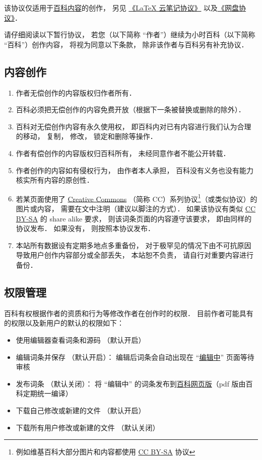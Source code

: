 
该协议仅适用于\href{http://wuli.wiki/online/}{百科内容}的创作， 另见 \href{http://wuli.wiki/online/NtLcns.html}{《LaTeX 云笔记协议》} 以及\href{http://www.example.com}{《网盘协议》}．

请仔细阅读以下暂行协议， 若您（以下简称 “作者”）继续为小时百科（以下简称 “百科”）创作内容， 将视为同意以下条款， 除非该作者与百科另有补充协议．

\subsection{内容创作}
\begin{enumerate}
\item 作者无偿创作的内容版权归作者所有．
\item 百科必须把无偿创作的内容免费开放（根据下一条被替换或删除的除外）．
\item 百科对无偿创作内容有永久使用权， 即百科内对已有内容进行我们认为合理的移动， 复制， 修改， 锁定和删除等操作．
\item 作者有偿创作的内容版权归百科所有， 未经同意作者不能公开转载．
\item 作者创作的内容如有侵权行为， 由作者本人承担， 百科没有义务也没有能力核实所有内容的原创性．
\item 若某页面使用了 \href{https://creativecommons.org/licenses/}{Creative Commons} （简称 CC）系列协议\footnote{例如维基百科大部分图片和内容都使用 \href{https://creativecommons.org/licenses/by-sa/3.0/}{CC BY-SA} 协议}（或类似协议）的图片或内容， 需要在文中注明（建议以脚注的方式）． 如果该协议有类似 \href{https://creativecommons.org/licenses/by-sa/3.0/}{CC BY-SA} 的 share alike 要求， 则该词条页面的内容遵守该要求， 即由同样的协议发布． 如果没有， 则按照本协议发布．
\item 本站所有数据设有定期多地点多重备份， 对于极罕见的情况下由不可抗原因导致用户创作内容部分或全部丢失， 本站恕不负责， 请自行对重要内容进行备份．
\end{enumerate}

\subsection{权限管理}
百科有权根据作者的资质和行为等修改作者在创作时的权限． 目前作者可能具有的权限以及新用户的默认的权限如下：
\begin{itemize}
\item 使用编辑器查看词条和源码 （默认开启）
\item 编辑词条并保存 （默认开启）： 编辑后词条会自动出现在 “\href{http://wuli.wiki/changed}{编辑中}” 页面等待审核
\item 发布词条 （默认关闭）： 将 “编辑中” 的词条发布到\href{http://wuli.wiki/online}{百科网页版}（pdf 版由百科定期统一编译）
\item 下载自己修改或新建的文件 （默认开启）
\item 下载所有用户修改或新建的文件 （默认关闭）
\end{itemize}
